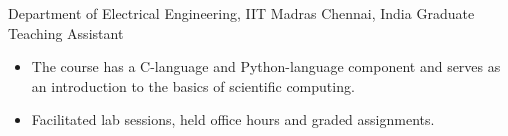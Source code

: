 
        {Department of Electrical Engineering, IIT Madras}
        {Chennai, India}
        {Graduate Teaching Assistant}
        {}{
    \begin{itemize}
        \item The course has a C-language and Python-language component and serves as an introduction to the basics of scientific computing.
        \item Facilitated lab sessions, held office hours and graded assignments.
    \end{itemize}
}
